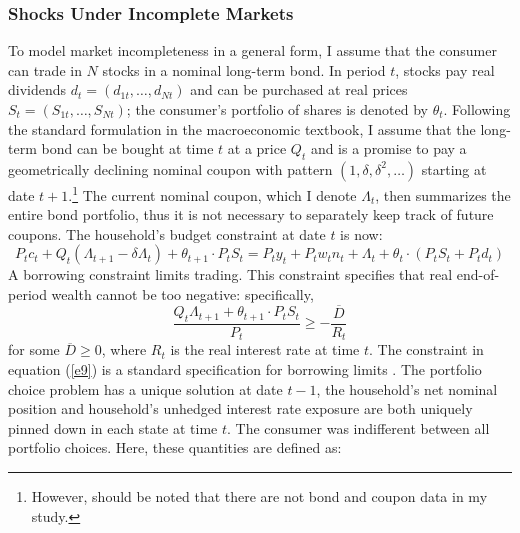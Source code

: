 \documentclass[11pt,letterpaper]{article}
\begin{document}
\subsubsection{Shocks Under Incomplete Markets} 
To model market incompleteness in a general form, I assume that the consumer can trade in $N$ stocks in a nominal long-term bond. In period $t$, stocks pay real dividends $d_{t} = (d_{1t}, \ldots, d_{Nt})$ and can be purchased at real prices $S_{t} = (S_{1t}, \ldots, S_{Nt} )$; the consumer's portfolio of shares is denoted by $\theta_{t}$. Following the standard formulation in the macroeconomic textbook, I assume that the long-term bond can be bought at time $t$ at a price $Q_{t}$ and is a promise to pay a geometrically declining nominal coupon with pattern $(1, \delta, \delta^{2}, \ldots)$ starting at date $t+1$.\footnote{However, should be noted that there are not bond and coupon data in my study.} The current nominal coupon, which I denote $\Lambda_{t}$, then summarizes the entire bond portfolio, thus it is not necessary to separately keep track of future coupons. The household's budget constraint at date $t$ is now: 
\begin{equation}
P_{t}c_{t} + Q_{t}(\Lambda_{t+1} - \delta \Lambda_{t}) + \theta_{t+1} \cdot P_{t}S_{t} = P_{t}y_{t} + P_{t}w_{t}n_{t} + \Lambda_{t} + \theta_{t} \cdot (P_{t}S_{t} + P_{t}d_{t})
\end{equation}
A borrowing constraint limits trading. This constraint specifies that real end-of-period wealth cannot be too negative: specifically,      
\begin{equation}\label{e9}
\frac{Q_{t}\Lambda_{t+1} + \theta_{t+1} \cdot P_{t}S_{t}}{P_{t}} \geq  - \frac{\overline{D}}{R_{t}}
\end{equation}
for some $\overline{D} \geq 0$, where $R_{t}$ is the real interest rate at time $t$. The constraint in equation (\ref{e9}) is a standard specification for borrowing limits \cite{Eggertsson2012}. The portfolio choice problem has a unique solution at date $t-1$, the household's net nominal position and household's unhedged interest rate exposure are both uniquely pinned down in each state at time $t$. The consumer was indifferent between all portfolio choices. Here, these quantities are defined as: 
\end{document}
